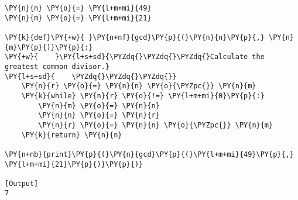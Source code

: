 \begin{Verbatim}[label=\makebox{\href{https://github.com/unipi-physics-labs/lab1-notes/tree/main/snippy/euclid_algorithm_func.py}{https://github.com/.../euclid\_algorithm\_func.py}},commandchars=\\\{\}]
\PY{n}{n} \PY{o}{=} \PY{l+m+mi}{49}
\PY{n}{m} \PY{o}{=} \PY{l+m+mi}{21}

\PY{k}{def}\PY{+w}{ }\PY{n+nf}{gcd}\PY{p}{(}\PY{n}{n}\PY{p}{,} \PY{n}{m}\PY{p}{)}\PY{p}{:}
\PY{+w}{    }\PY{l+s+sd}{\PYZdq{}\PYZdq{}\PYZdq{}Calculate the greatest common divisor.}
\PY{l+s+sd}{    \PYZdq{}\PYZdq{}\PYZdq{}}
    \PY{n}{r} \PY{o}{=} \PY{n}{n} \PY{o}{\PYZpc{}} \PY{n}{m}
    \PY{k}{while} \PY{n}{r} \PY{o}{!=} \PY{l+m+mi}{0}\PY{p}{:}
        \PY{n}{m} \PY{o}{=} \PY{n}{n}
        \PY{n}{n} \PY{o}{=} \PY{n}{r}
        \PY{n}{r} \PY{o}{=} \PY{n}{n} \PY{o}{\PYZpc{}} \PY{n}{m}
    \PY{k}{return} \PY{n}{n}

\PY{n+nb}{print}\PY{p}{(}\PY{n}{gcd}\PY{p}{(}\PY{l+m+mi}{49}\PY{p}{,} \PY{l+m+mi}{21}\PY{p}{)}\PY{p}{)}

[Output]
7
\end{Verbatim}
